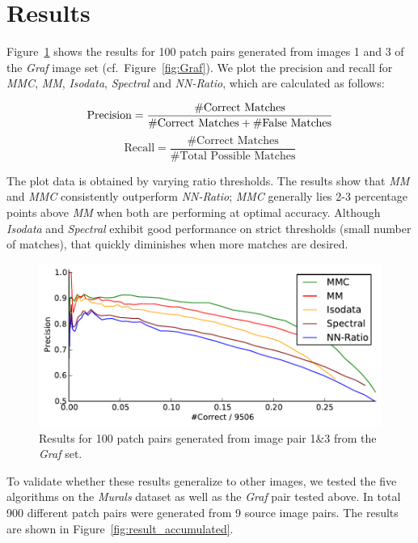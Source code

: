 \documentclass[conference]{IEEEtran}
\begin{document}
\section{Results}
\label{S:Results}

Figure~\ref{fig:result_graf} shows the results for 100 patch pairs 
generated from images 1 and 3 of the \emph{Graf} image set 
(cf.~Figure~\ref{fig:Graf}). We plot the precision and recall for 
\emph{MMC}, \emph{MM}, \emph{Isodata}, \emph{Spectral} and 
\emph{NN-Ratio}, which are calculated as follows:

\begin{equation*}
    \textrm{Precision} = \frac{\#\textrm{Correct Matches}}{\#\textrm{Correct Matches} + 
     \#\textrm{False Matches}} \\
\end{equation*}
\begin{equation*}
    \textrm{Recall} = \frac{\#\textrm{Correct Matches}}{\#\textrm{Total Possible Matches}}
\end{equation*}

The plot data is obtained by varying ratio thresholds.  The results show 
that \emph{MM} and \emph{MMC} consistently outperform \emph{NN-Ratio}; 
\emph{MMC} generally lies 2-3 percentage points above \emph{MM} when 
both are performing at optimal accuracy.  Although \emph{Isodata} and 
\emph{Spectral} exhibit good performance on strict thresholds (small 
number of matches), that quickly diminishes when more matches are 
desired.

\begin{figure}[htb]
    \centering
    \includegraphics[width=0.9\columnwidth]{images/result_graf}
    \caption{Results for 100 patch pairs generated from image pair 1\&3 
from the \emph{Graf} set.}
	\label{fig:result_graf}
\end{figure}

To validate whether these results generalize to other images, we tested 
the five algorithms on the \emph{Murals} dataset as well as the 
\emph{Graf} pair tested above.  In total 900 different patch pairs were 
generated from 9 source image pairs.  The results are shown in 
Figure~\ref{fig:result_accumulated}. 
\end{document}
